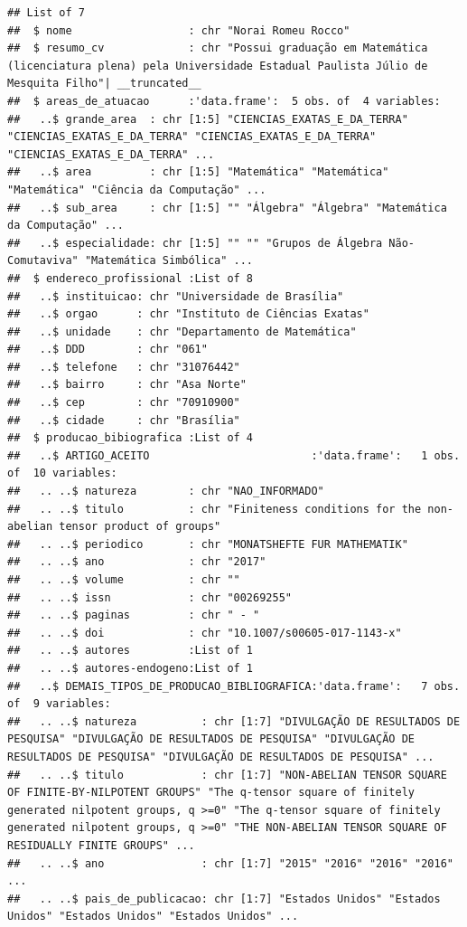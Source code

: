 \documentclass[]{article}
\begin{document}
\begin{verbatim}
## List of 7
##  $ nome                  : chr "Norai Romeu Rocco"
##  $ resumo_cv             : chr "Possui graduação em Matemática (licenciatura plena) pela Universidade Estadual Paulista Júlio de Mesquita Filho"| __truncated__
##  $ areas_de_atuacao      :'data.frame':  5 obs. of  4 variables:
##   ..$ grande_area  : chr [1:5] "CIENCIAS_EXATAS_E_DA_TERRA" "CIENCIAS_EXATAS_E_DA_TERRA" "CIENCIAS_EXATAS_E_DA_TERRA" "CIENCIAS_EXATAS_E_DA_TERRA" ...
##   ..$ area         : chr [1:5] "Matemática" "Matemática" "Matemática" "Ciência da Computação" ...
##   ..$ sub_area     : chr [1:5] "" "Álgebra" "Álgebra" "Matemática da Computação" ...
##   ..$ especialidade: chr [1:5] "" "" "Grupos de Álgebra Não-Comutaviva" "Matemática Simbólica" ...
##  $ endereco_profissional :List of 8
##   ..$ instituicao: chr "Universidade de Brasília"
##   ..$ orgao      : chr "Instituto de Ciências Exatas"
##   ..$ unidade    : chr "Departamento de Matemática"
##   ..$ DDD        : chr "061"
##   ..$ telefone   : chr "31076442"
##   ..$ bairro     : chr "Asa Norte"
##   ..$ cep        : chr "70910900"
##   ..$ cidade     : chr "Brasília"
##  $ producao_bibiografica :List of 4
##   ..$ ARTIGO_ACEITO                         :'data.frame':   1 obs. of  10 variables:
##   .. ..$ natureza        : chr "NAO_INFORMADO"
##   .. ..$ titulo          : chr "Finiteness conditions for the non-abelian tensor product of groups"
##   .. ..$ periodico       : chr "MONATSHEFTE FUR MATHEMATIK"
##   .. ..$ ano             : chr "2017"
##   .. ..$ volume          : chr ""
##   .. ..$ issn            : chr "00269255"
##   .. ..$ paginas         : chr " - "
##   .. ..$ doi             : chr "10.1007/s00605-017-1143-x"
##   .. ..$ autores         :List of 1
##   .. ..$ autores-endogeno:List of 1
##   ..$ DEMAIS_TIPOS_DE_PRODUCAO_BIBLIOGRAFICA:'data.frame':   7 obs. of  9 variables:
##   .. ..$ natureza          : chr [1:7] "DIVULGAÇÃO DE RESULTADOS DE PESQUISA" "DIVULGAÇÃO DE RESULTADOS DE PESQUISA" "DIVULGAÇÃO DE RESULTADOS DE PESQUISA" "DIVULGAÇÃO DE RESULTADOS DE PESQUISA" ...
##   .. ..$ titulo            : chr [1:7] "NON-ABELIAN TENSOR SQUARE OF FINITE-BY-NILPOTENT GROUPS" "The q-tensor square of finitely generated nilpotent groups, q >=0" "The q-tensor square of finitely generated nilpotent groups, q >=0" "THE NON-ABELIAN TENSOR SQUARE OF RESIDUALLY FINITE GROUPS" ...
##   .. ..$ ano               : chr [1:7] "2015" "2016" "2016" "2016" ...
##   .. ..$ pais_de_publicacao: chr [1:7] "Estados Unidos" "Estados Unidos" "Estados Unidos" "Estados Unidos" ...

\end{verbatim}
\end{document}
